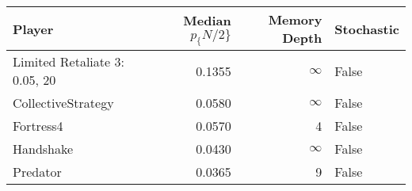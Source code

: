 \begin{tabular}{lrrl}
\toprule
                        Player &  Median $p_\{N/2\}$ &  Memory Depth & Stochastic \\
\midrule
 Limited Retaliate 3: 0.05, 20 &            0.1355 &            \(\infty\) &      False \\
            CollectiveStrategy &            0.0580 &            \(\infty\) &      False \\
                     Fortress4 &            0.0570 &             4 &      False \\
                     Handshake &            0.0430 &            \(\infty\) &      False \\
                      Predator &            0.0365 &             9 &      False \\
\bottomrule
\end{tabular}
